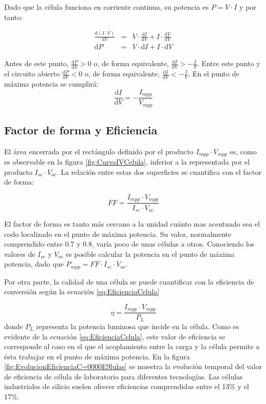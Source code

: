 Dado que la célula funciona en corriente continua, su potencia es
$P=V\cdot I$ y por tanto:

\begin{eqnarray}
\frac{\mathrm{d}(I\cdot V)}{\mathrm{d}V} & = & V\cdot\frac{\mathrm{d}I}{\mathrm{d}V}+I\cdot\frac{\mathrm{d}V}{\mathrm{d}V}\nonumber \\
\mathrm{d}P & = & V\cdot\mathrm{d}I+I\cdot\mathrm{d}V\end{eqnarray}


Antes de este punto, $\frac{\mathrm{d}P}{\mathrm{d}V}>0$ o, de
forma equivalente, $\frac{\mathrm{d}I}{\mathrm{d}V}>-\frac{I}{V}$.
Entre este punto y el circuito abierto $\frac{\mathrm{d}P}{\mathrm{d}V}<0$
o, de forma equivalente, $\frac{\mathrm{d}I}{\mathrm{d}V}<-\frac{I}{V}$.
En el punto de máxima potencia se cumplirá:\begin{equation}
\frac{\mathrm{d}I}{\mathrm{d}V}=-\frac{I_{mpp}}{V_{mpp}}\label{eq:MPP_derivada}\end{equation}



\subsection{Factor de forma y Eficiencia}

El área encerrada por el rectángulo definido por el producto $I_{mpp}\cdot V_{mpp}$
es, como es observable en la figura \ref{fig:CurvaIVCelula}, inferior
a la representada por el producto $I_{sc}\cdot V_{oc}$. La relación
entre estas dos superficies se cuantifica con el factor de forma:

\begin{equation}
FF=\frac{I_{mpp}\cdot V_{mpp}}{I_{sc}\cdot V_{oc}}\label{eq:FactorForma}\end{equation}

El factor de forma es tanto más cercano a la unidad cuánto mas acentuado
sea el codo localizado en el punto de máxima potencia. Su valor, normalmente
comprendido entre $0.7$ y $0.8$, varía poco de unas células a otros.
Conociendo los valores de $I_{sc}$ y $V_{oc}$ es posible calcular
la potencia en el punto de máxima potencia, dado que $P_{mpp}=FF\cdot I_{sc}\cdot V_{oc}$.

Por otra parte, la calidad de una célula se puede cuantificar con
la eficiencia de conversión según la ecuación \ref{eq:EficienciaCelula}

\begin{equation}
\eta=\frac{I_{mpp}\cdot V_{mpp}}{P_{L}}\label{eq:EficienciaCelula}\end{equation}
donde $P_{L}$ representa la potencia luminosa que incide en la célula.
Como es evidente de la ecuación \ref{eq:EficienciaCelula}, este valor
de eficiencia se corresponde al caso en el que el acoplamiento entre
la carga y la célula permite a ésta trabajar en el punto de máxima
potencia. En la figura \ref{fig:EvolucionEficienciaC=0000E9lulas}
se muestra la evolución temporal del valor de eficiencia de célula
de laboratorio para diferentes tecnologías. Las células industriales
de silicio suelen ofrecer eficiencias comprendidas entre el 13\% y
el 17\%.

